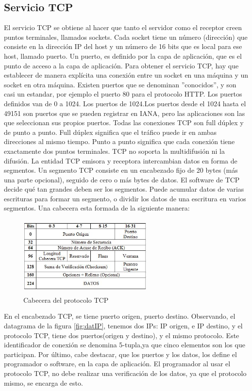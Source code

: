 \subsection{Servicio TCP}
	El servicio TCP se obtiene al hacer que tanto el servidor como el receptor creen puntos terminales, llamados sockets. Cada socket tiene un número (dirección) que consiste en la dirección IP del host y un número de 16 bits que es local para ese host, llamado puerto. Un puerto, es definido por la capa de aplicación, que es el punto de acceso a la capa de aplicación. Para obtener el servicio TCP, hay que establecer de manera explícita una conexión entre un socket en una máquina y un socket en otra máquina. 
	Existen puertos que se denominan ''conocidos'', y son casi un estandar, por ejemplo el puerto 80 para el protocolo HTTP. Los puertos definidos van de 0 a 1024. Los puertos de 1024.Los puertos desde el 1024 hasta el 49151 son puertos que se pueden registrar en IANA, pero las aplicaciones son las que seleccionan sus propios puertos.  
	Todas las conexiones TCP son full dúplex y de punto a punto. Full dúplex significa que el tráfico puede 	ir en ambas direcciones al mismo tiempo. Punto a punto significa que cada conexión tiene exactamente dos puntos terminales. TCP no soporta la multidifusión ni la difusión. 
	La entidad TCP emisora y receptora intercambian datos en forma de segmentos. Un segmento TCP consiste en un encabezado fijo de 20 bytes (más una parte opcional), seguido de cero o más bytes de datos. El software de TCP decide qué tan grandes deben ser los segmentos. Puede acumular datos de varias escrituras para formar un segmento, o dividir los datos de una escritura en varios segmentos. Una cabecera esta formada de la siguiente manera: 
	\begin{figure}[ht]
		\centering 
		\includegraphics[height=4cm,width=0.6\textwidth]{parte_2/redes/cabecera-tcp} 
		\caption{Cabecera del protocolo TCP}
	\end{figure}

	En el encabezado TCP, se tiene puerto origen, puerto destino. Observando, el datagrama de la figura \ref{fig:datIP}, tenemos dos IPs: IP origen, e IP destino, y el protocolo TCP, tiene dos puertos(origen y destino), y el mismo protocolo. Este identificador de conexión se denomina 5-tupla,ya que cinco elementos son los que participan. 
	Por último, cabe destacar, que los puertos y los datos, los define el programador o software, en la capa de aplicación. El programador al usar el protocolo TCP, no debe realizar una verificación de los datos, ya que el protocolo mismo, se encarga de esto. 
	
